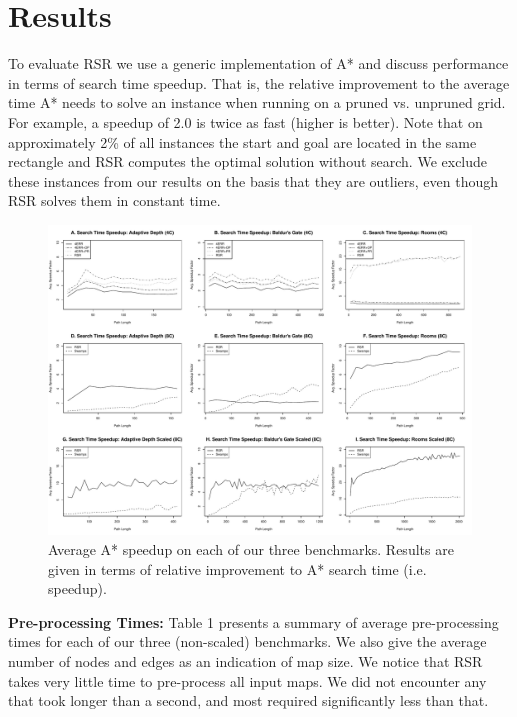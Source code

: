 \section{Results}
\label{cha::rsr::results}
To evaluate RSR we use a generic implementation of A* and discuss performance 
in terms of search time speedup. That is, the relative improvement to the average 
time A* needs to solve an instance when running on a pruned  vs. unpruned grid.
For example, a speedup of 2.0 is twice as fast (higher is better).
Note that on approximately 2\% of all instances the start and goal are located
in the same rectangle and RSR computes the optimal solution without
search.  We exclude these instances from our results on the basis that they are 
outliers, even though RSR solves them in constant time.

\par 
\begin{figure}[t]
\begin{center}
   \includegraphics[width=0.97\columnwidth, trim = 10mm 10mm 10mm 0mm]{chapter_rsr/diagrams/speedup.pdf}
\end{center}
\caption[Search time speedup: RSR]
{\small 
Average A* speedup on each of our three benchmarks. 
Results are given in terms of relative improvement to A* search time (i.e. speedup).}
\label{fig::rsr::speedup}
\end{figure}


\textbf{Pre-processing Times: } 
Table 1 presents a summary of average pre-processing times for
each of our three (non-scaled) benchmarks. We also give the average number of
nodes and edges as an indication of map size.
We notice that RSR takes very little time to pre-process all input maps. 
We did not encounter any that took longer than a second, and most required 
significantly less than that. 

